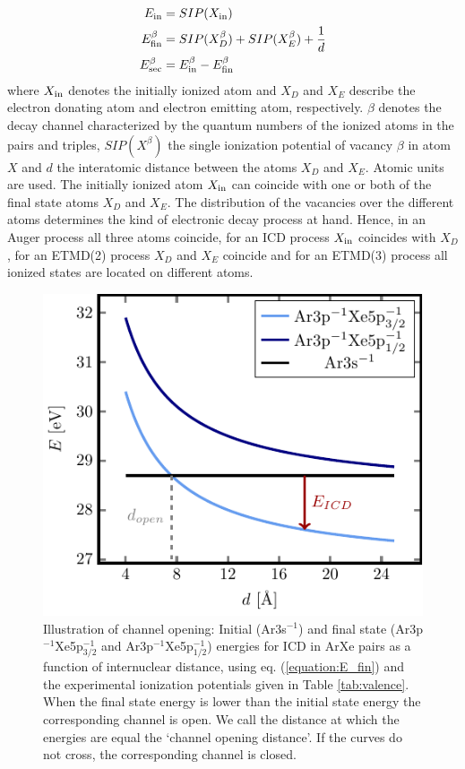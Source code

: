 \begin{align}
 E_{\rm in}        &= SIP(X_{\rm in}) \label{equation:E_in}\\
 E_{\rm fin}^\beta &= SIP(X_{D}^\beta) + SIP(X_{E}^\beta) + \frac 1d
           \label{equation:E_fin}\\
 E_{\rm sec}^\beta &= E_{\rm in}^\beta - E_{\rm fin}^\beta \label{equation:E_sec}
\end{align}
where $X_{\rm in}$ denotes the initially ionized atom and
$X_{D}$ and $X_{E}$ describe the electron donating atom and electron
emitting atom, respectively.
$\beta$ denotes the decay channel characterized by the quantum numbers of the ionized atoms in the pairs and triples, $SIP(X^\beta)$ the single ionization potential of vacancy $\beta$ in atom $X$ and $d$ the interatomic distance between the atoms $X_{D}$ and $X_{E}$. 
Atomic units are used.
The initially ionized atom $X_{\rm in}$ can
coincide with one or both of
the final state atoms
$X_{D}$ and $X_{E}$.
The distribution of the vacancies over the different
atoms determines the kind of electronic decay process at hand. Hence, in an
Auger process all three atoms coincide, for an ICD process $X_{\rm in}$
coincides with $X_{D}$, for an ETMD(2) process $X_D$ and $X_E$ coincide
and for an ETMD(3) process
all ionized states are located on different atoms.

\begin{figure}[h]
 \centering
 \includegraphics[width=\columnwidth]{pics/channel_open_ICD.pdf}
 \caption{Illustration of channel opening: Initial (Ar3s$^{-1}$)
          and final state (Ar3p$^{-1}$Xe5p$_{3/2}^{-1}$ and
          Ar3p$^{-1}$Xe5p$_{1/2}^{-1}$) energies
          for ICD in ArXe pairs as a function of 
          internuclear distance, using eq. (\ref{equation:E_fin})
          and the experimental ionization
          potentials given
          in Table \ref{tab:valence}. When the final state energy is lower
          than the initial state energy the corresponding channel
          is open. We call the distance at which the energies are equal
          the `channel opening distance'. If the curves do not cross, the
          corresponding channel is closed.}
 \label{figure:channel_open_ICD}
\end{figure}

